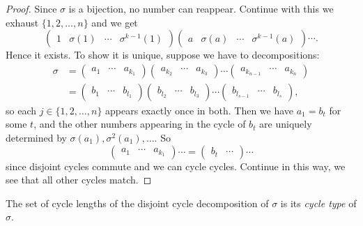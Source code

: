 \documentclass[10pt]{article}
\begin{document}
\begin{proof}
        Since $ \sigma $ is a bijection, no number can reappear. Continue with this we exhaust $\{1,2,\dots,n\}$ and we get 
        \[
            \begin{pmatrix}
                1&\sigma(1)&\cdots&\sigma^{k-1}(1)
            \end{pmatrix}
            \begin{pmatrix}
                a&\sigma(a)&\cdots&\sigma^{k-1}(a)
            \end{pmatrix}
            \cdots
        .\]
        Hence it exists. To show it is unique, suppose we have to decompositions:
        \[
            \begin{aligned}
                 \sigma&= \begin{pmatrix} a_1&\cdots&a_{k_1} \end{pmatrix}\begin{pmatrix} a_{k_2}&\cdots&a_{k_3} \end{pmatrix}\cdots \begin{pmatrix} a_{k_{n-1}}&\cdots&a_{k_n} \end{pmatrix}\\
                 &= \begin{pmatrix} b_1&\cdots&b_{l_1} \end{pmatrix}\begin{pmatrix} b_{l_2}&\cdots&b_{l_3} \end{pmatrix}\cdots \begin{pmatrix} b_{l_{s-1}}&\cdots&b_{l_s} \end{pmatrix},
            \end{aligned}
        \]
        so each $ j\in \{1,2,\dots,n\} $ appears exactly once in both. Then we have $ a_1=b_t $ for some $t$, and the other numbers appearing in the cycle of $b_t$ are uniquely determined by $ \sigma(a_1),\sigma^2(a_1),\dots $. So
        \[
            \begin{pmatrix} a_1&\cdots&a_{k_1} \end{pmatrix}\cdots = \begin{pmatrix} b_t&\cdots \end{pmatrix}\cdots
        \]
        since disjoint cycles commute and we can cycle cycles. Continue in this way, we see that all other cycles match. 
    \end{proof}
    \begin{definition}
        The set of cycle lengths of the disjoint cycle decomposition of $ \sigma $ is its \textit{cycle type} of $\sigma$.
    \end{definition}
\end{document}
